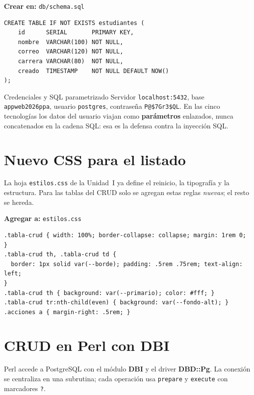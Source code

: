 {\small\textbf{Crear en:} \texttt{db/schema.sql}}
\begin{lstlisting}[style=sql,caption={Esquema compartido de la tabla estudiantes},label={lst:c6-schema}]
CREATE TABLE IF NOT EXISTS estudiantes (
    id      SERIAL       PRIMARY KEY,
    nombre  VARCHAR(100) NOT NULL,
    correo  VARCHAR(120) NOT NULL,
    carrera VARCHAR(80)  NOT NULL,
    creado  TIMESTAMP    NOT NULL DEFAULT NOW()
);
\end{lstlisting}

\begin{cajaadvertencia}{Credenciales y SQL parametrizado}
Servidor \texttt{localhost:5432}, base \texttt{appweb2026ppa}, usuario
\texttt{postgres}, contraseña \texttt{P@\$7Gr3\$QL}. En las cinco
tecnologías los datos del usuario viajan como \textbf{parámetros}
enlazados, nunca concatenados en la cadena SQL: esa es la defensa contra
la inyección SQL.
\end{cajaadvertencia}

\section{Nuevo CSS para el listado}
\label{sec:cap6:css}

La hoja \texttt{estilos.css} de la Unidad~I ya define el reinicio, la
tipografía y la estructura. Para las tablas del CRUD solo se agregan
estas reglas \emph{nuevas}; el resto se hereda.

{\small\textbf{Agregar a:} \texttt{estilos.css}}
\begin{lstlisting}[style=css,caption={Reglas nuevas para la tabla del CRUD},label={lst:c6-css}]
.tabla-crud { width: 100%; border-collapse: collapse; margin: 1rem 0; }
.tabla-crud th, .tabla-crud td {
  border: 1px solid var(--borde); padding: .5rem .75rem; text-align: left;
}
.tabla-crud th { background: var(--primario); color: #fff; }
.tabla-crud tr:nth-child(even) { background: var(--fondo-alt); }
.acciones a { margin-right: .5rem; }
\end{lstlisting}

\section{CRUD en Perl con DBI}
\label{sec:cap6:perl}

Perl accede a PostgreSQL con el módulo \textbf{DBI} y el driver
\textbf{DBD::Pg}. La conexión se centraliza en una subrutina; cada
operación usa \texttt{prepare} y \texttt{execute} con marcadores
\texttt{?}.


